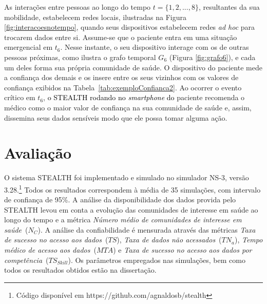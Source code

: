 \documentclass[12pt]{article}
\newcommand{\as}[1]{\textcolor{blue}{{\bf #1}}}
\newcommand{\rev}[1]{\textcolor{black}{{#1}}}
\begin{document}

As interações entre pessoas ao longo do tempo $t = \{1,2,...,8\}$, resultantes da sua mobilidade, estabelecem redes locais, ilustradas na Figura \ref{fig:interacoesnotempo}, quando seus dispositivos estabelecem redes \textit{ad hoc} para trocarem dados entre si. Assume-se que o paciente entra em uma situação emergencial em $t_6$. Nesse instante, o seu dispositivo interage com os de outras pessoas próximas, como ilustra o grafo temporal $G_6$ (Figura \ref{fig:grafo6}), e cada um deles forma sua própria comunidade de saúde. O dispositivo do paciente mede a confiança dos demais e os insere entre os seus 
vizinhos com os valores de confiança exibidos na  Tabela~\ref{tab:exemploConfianca2}. Ao ocorrer o evento crítico em $t_6$, \rev{o STEALTH rodando no \textit{smartphone} do} paciente recomenda o médico como 
o maior valor de confiança na sua comunidade de saúde e, assim, dissemina seus dados sensíveis modo que ele possa tomar alguma ação.

\section{Avaliação} %
\label{sec:aval}

O sistema \mbox{STEALTH} foi implementado e simulado no simulador NS-3, versão 3.28.\footnote{Código disponível em https://github.com/agnaldosb/stealth}
Todos os resultados correspondem à média de 35 simulações, com intervalo de confiança de 95\%. 
A análise da disponibilidade dos dados provida pelo \mbox{STEALTH} levou em conta a evolução das comunidades de interesse em saúde ao longo do tempo e a métrica \textit{Número médio de comunidades de interesse em saúde}~($N_{C}$). A análise da confiabilidade é mensurada através das métricas \textit{Taxa de sucesso no acesso aos dados}~($TS$), \textit{Taxa de dados não acessados}~($TN_a$), \textit{Tempo médico de acesso aos dados}~($MTA$) e \textit{Taxa de sucesso no acesso aos dados por competência}~($TS_{Skill}$).
Os parâmetros empregados nas simulações, bem como todos os resultados obtidos estão na dissertação.
\end{document}
